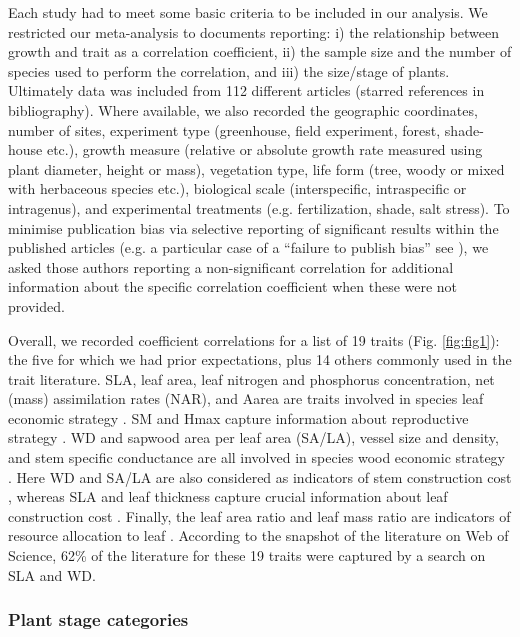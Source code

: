 \documentclass[a4paper,11pt]{article}
\begin{document}
Each study had to meet some basic criteria to be included in our analysis. We restricted our meta-analysis to documents reporting: i) the relationship between growth and trait as a correlation coefficient, ii) the sample size and the number of species used to perform the correlation, and iii) the size/stage of plants. Ultimately data was included from 112 different articles (starred references in bibliography). Where available, we also recorded the geographic coordinates, number of sites, experiment type (greenhouse, field experiment, forest, shade-house etc.), growth measure (relative or absolute growth rate measured using plant diameter, height or mass), vegetation type, life form (tree, woody or mixed with herbaceous species etc.), biological scale (interspecific, intraspecific or intragenus), and experimental treatments (e.g. fertilization, shade, salt stress). To minimise publication bias via selective reporting of significant results within the published articles (e.g. a particular case of a ``failure to publish bias'' see \citealt{Jennions:2013ta}), we asked those authors reporting a non-significant correlation for additional information about the specific correlation coefficient when these were not provided.

Overall, we recorded coefficient correlations for a list of 19 traits (Fig. \ref{fig:fig1}): the five for which we had prior expectations, plus 14 others commonly used in the trait literature. SLA, leaf area, leaf nitrogen and phosphorus concentration, net (mass) assimilation rates (NAR), and Aarea are traits involved in species leaf economic strategy \citep{Wright:2004jb,Wright:2010tp}. SM and Hmax capture information about reproductive strategy \citep{Falster:2005bw,Moles:2006ft}. WD and sapwood area per leaf area (SA/LA), vessel size and density, and stem specific conductance are all involved in species wood economic strategy  \citep{Chave:2009iy}. Here WD and SA/LA are also considered as indicators of stem construction cost \citep{Falster:2011ii}, whereas SLA and leaf thickness capture crucial information about leaf construction cost \citep{Wright:2004jb}. Finally, the leaf area ratio and leaf mass ratio are indicators of resource allocation to leaf \citep{Lambers:1992bj}. According to the snapshot of the literature on Web of Science, 62\% of the literature for these 19 traits were captured by a search on SLA and WD.

\subsubsection*{Plant stage categories}\label{plant-stage-categories}
\end{document}
